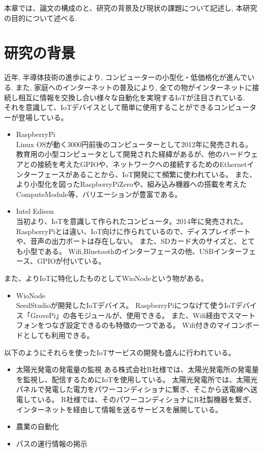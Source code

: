 本章では、論文の構成のと、研究の背景及び現状の課題について記述し, 本研究の目的について述べる.


\section{研究の背景}
近年, 半導体技術の進歩により, コンピューターの小型化・低価格化が進んでいる. 
また, 家庭へのインターネットの普及により, 全ての物がインターネットに接続し相互に情報を交換し合い様々な自動化を実現するIoTが注目されている.\\

それを意識して、IoTデバイスとして簡単に使用することができるコンピューターが登場している。
\begin{itemize}
\item RaspberryPi\\
	Linux OSが動く3000円前後のコンピューターとして2012年に発売される。
	教育用の小型コンピュータとして開発された経緯があるが、他のハードウェアとの接続を考えたGPIOや、ネットワークへの接続するためのEthernetインターフェースがあることから、IoT開発にて頻繁に使われている。
	また、より小型化を図ったRaspberryPiZeroや、組み込み機器への搭載を考えたComputeModule等、バリエーションが豊富である。
\item Intel Edison\\
	当初より、IoTを意識して作られたコンピュータ。2014年に発売された。
	RaspberryPiとは違い、IoT向けに作られているので、ディスプレイポートや、音声の出力ポートは存在しない。
	また、SDカード大のサイズと、とても小型である。
	Wifi,Bluetoothのインターフェースの他、USBインターフェース、GPIOが付いている。
\end{itemize}
また、よりIoTに特化したものとしてWioNodeという物がある。
\begin{itemize}
\item WioNode\\
	SeedStudioが開発したIoTデバイス。
	RaspberryPiにつなげて使うIoTデバイス「GrovePi」の各モジュールが、使用できる。
	また、Wifi経由でスマートフォンをつなぎ設定できるのも特徴の一つである。
	Wifi付きのマイコンボードとしても利用できる。
\end{itemize}

以下のようにそれらを使ったIoTサービスの開発も盛んに行われている。
\begin{itemize}
\item 太陽光発電の発電量の監視
	ある株式会社R社様では、太陽光発電所の発電量を監視し、配信するためにIoTを使用している。
	太陽光発電所では、太陽光パネルで発電した電力をパワーコンディショナに繋ぎ、そこから送電線へ送電している。
	R社様では、そのパワーコンディショナにR社製機器を繋ぎ、インターネットを経由して情報を送るサービスを展開している。
\item 農業の自動化
	
\item パスの運行情報の掲示
	
\end{itemize}

